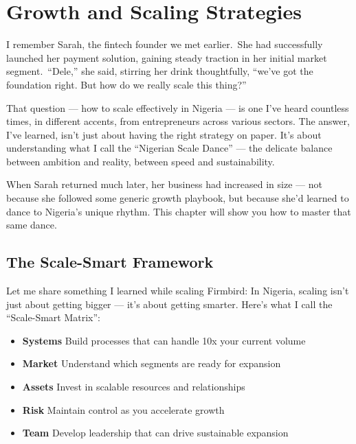 
\chapter{Growth and Scaling Strategies}\label{ch:growth-and-scaling-strategies}

I remember Sarah, the fintech founder we met earlier.\ She had successfully launched her payment solution, gaining steady traction in her initial market segment.\ ``Dele,'' she said, stirring her drink thoughtfully, ``we've got the foundation right. But how do we really scale this thing?''

That question --- how to scale effectively in Nigeria --- is one I've heard countless times, in different accents, from entrepreneurs across various sectors. The answer, I've learned, isn't just about having the right strategy on paper. It's about understanding what I call the ``Nigerian Scale Dance'' --- the delicate balance between ambition and reality, between speed and sustainability.

\begin{importantbox}
When Sarah returned much later, her business had increased in size --- not because she followed some generic growth playbook, but because she'd learned to dance to Nigeria's unique rhythm. This chapter will show you how to master that same dance.
\end{importantbox}

\section{The Scale-Smart Framework}\label{sec:scale-smart-framework}

Let me share something I learned while scaling Firmbird: In Nigeria, scaling isn't just about getting bigger --- it's about getting smarter. Here's what I call the ``Scale-Smart Matrix'':

\begin{tcolorbox}[colback=white,colframe=primarydark,title=\textbf{Scale-Smart Components}]
\begin{itemize}
    \item \textbf{Systems}
    Build processes that can handle 10x your current volume

    \item \textbf{Market}
    Understand which segments are ready for expansion

    \item \textbf{Assets}
    Invest in scalable resources and relationships

    \item \textbf{Risk}
    Maintain control as you accelerate growth

    \item \textbf{Team}
    Develop leadership that can drive sustainable expansion
\end{itemize}
\end{tcolorbox}

